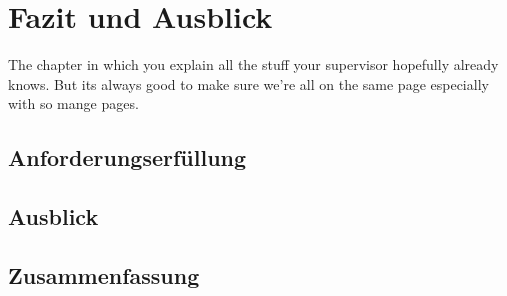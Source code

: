 \documentclass[thesis.tex]{subfiles}
\begin{document}
\chapter{Fazit und Ausblick}\label{chap:fazit}
The chapter in which you explain all the stuff your supervisor hopefully already knows. But its always good to make sure we're all on the same page especially with so mange pages.

\section{Anforderungserfüllung}
\section{Ausblick}
\section{Zusammenfassung}

\subfilebib %
\end{document}
